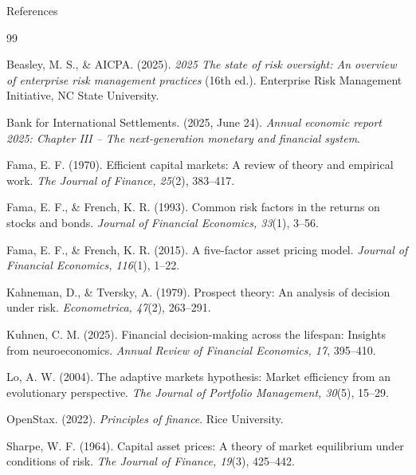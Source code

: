 \documentclass[aspectratio=169]{beamer}
\begin{document}
	\begin{frame}{References}
		\scriptsize
		\begin{thebibliography}{99}
			
			 Beasley, M. S., \& AICPA. (2025). \textit{2025 The state of risk oversight: An overview of enterprise risk management practices} (16th ed.). Enterprise Risk Management Initiative, NC State University.
			
			 Bank for International Settlements. (2025, June 24). \textit{Annual economic report 2025: Chapter III – The next-generation monetary and financial system}.
			
			 Fama, E. F. (1970). Efficient capital markets: A review of theory and empirical work. \textit{The Journal of Finance, 25}(2), 383–417.
			
			 Fama, E. F., \& French, K. R. (1993). Common risk factors in the returns on stocks and bonds. \textit{Journal of Financial Economics, 33}(1), 3–56.
			
			 Fama, E. F., \& French, K. R. (2015). A five-factor asset pricing model. \textit{Journal of Financial Economics, 116}(1), 1–22.
			
			 Kahneman, D., \& Tversky, A. (1979). Prospect theory: An analysis of decision under risk. \textit{Econometrica, 47}(2), 263–291.
			
			 Kuhnen, C. M. (2025). Financial decision-making across the lifespan: Insights from neuroeconomics. \textit{Annual Review of Financial Economics, 17}, 395–410.
			
			 Lo, A. W. (2004). The adaptive markets hypothesis: Market efficiency from an evolutionary perspective. \textit{The Journal of Portfolio Management, 30}(5), 15–29.
			
			 OpenStax. (2022). \textit{Principles of finance}. Rice University.
			
			 Sharpe, W. F. (1964). Capital asset prices: A theory of market equilibrium under conditions of risk. \textit{The Journal of Finance, 19}(3), 425–442.
			
		\end{thebibliography}
	\end{frame}
	
\end{document}
